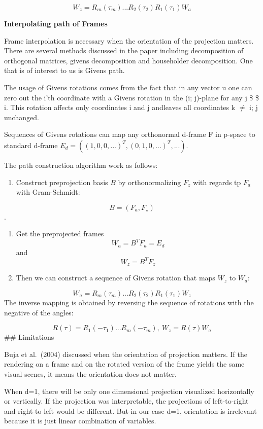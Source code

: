 \[ W_z = R_m(\tau_m) ... R_2(\tau_2)R_1(\tau_1)W_a\]

\textbf{Interpolating path of Frames}

Frame interpolation is necessary when the orientation of the projection matters. There are several methods discussed in the paper including decomposition of orthogonal matrices, givens decomposition and householder decomposition. One that is of interest to us is Givens path.

The usage of Givens rotations comes from the fact that in any vector u one can zero out the i'th coordinate with a Givens rotation in the (i; j)-plane for any j \$ \neq \$ i. This rotation affects only coordinates i and j andleaves all coordinates k \(\neq\) i; j unchanged.

Sequences of Givens rotations can map any orthonormal d-frame F in p-space to standard d-frame \(E_d=((1, 0, 0, ...)^T, (0, 1, 0, ...)^T, ...)\).

The path construction algorithm work as follows:

\begin{enumerate}
\def\labelenumi{\arabic{enumi}.}
\tightlist
\item
  Construct preprojection basis \(B\) by orthonormalizing \(F_z\) with regards tp \(F_a\) with Gram-Schmidt:
\end{enumerate}

\[B = (F_a, F_{\star})\].

\begin{enumerate}
\def\labelenumi{\arabic{enumi}.}
\setcounter{enumi}{1}
\tightlist
\item
  Get the preprojected frames
  \[W_a = B^TF_a = E_d\] and \[W_z = B^TF_z\]
\item
  Then we can construct a sequence of Givens rotation that maps \(W_z\) to \(W_a\):
\end{enumerate}

\[ W_a = R_m(\tau_m) ... R_2(\tau_2)R_1(\tau_1)W_z\] The inverse mapping is obtained by reversing the sequence of rotations with the negative of the angles:

\[R(\tau) = R_1(-\tau_1) ... R_m(-\tau_m), \    W_z = R(\tau)W_a\]
\#\# Limitations

Buja et al.~(2004) discussed when the orientation of projection matters. If the rendering on a frame and on the rotated version of the frame yields the same visual scenes, it means the orientation does not matter.

When d=1, there will be only one dimensional projection visualized horizontally or vertically. If the projection was interpretable, the projections of left-to-right and right-to-left would be different. But in our case d=1, orientation is irrelevant because it is just linear combination of variables.

